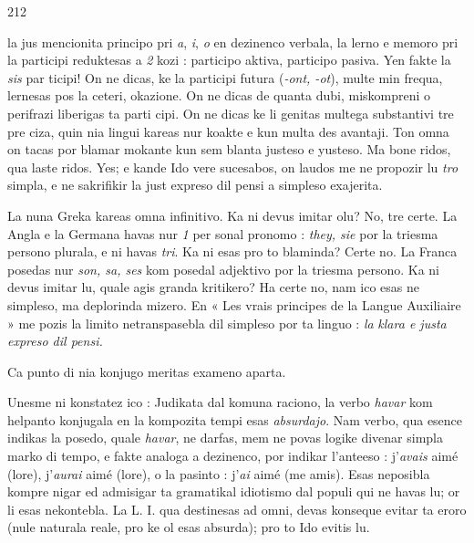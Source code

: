 \begin{VUpage}[216]{212}
\VUasterismo{107.61mm}

\VUcontinue
la jus mencionita principo pri \textit{a}, \textit{i}, \textit{o} en dezinenco verbala,\nl
la lerno e memoro pri la participi reduktesas a \textit{2} kozi :\nl
{} participo aktiva,  participo pasiva. Yen fakte la \textit{sis} par\cc
ticipi! On ne dicas, ke la participi futura (\textit{-ont, -ot}), multe\nl
min frequa, lernesas pos la ceteri, okazione. On ne dicas\nl
de quanta dubi, miskompreni o perifrazi liberigas ta parti\cc
cipi. On ne dicas ke li genitas multega substantivi tre pre\cc
ciza, quin nia lingui kareas nur koakte e kun multa des\cc
avantaji. Ton omna on tacas por blamar mokante kun sem\cc
blanta justeso e yusteso. Ma bone ridos, qua laste ridos.\nl
Yes; e kande Ido vere sucesabos, on laudos me ne propozir\nl
lu \textit{tro} simpla, e ne sakrifikir la just expreso dil pensi a\nl
simpleso exajerita.

La nuna Greka kareas omna infinitivo. Ka ni devus imitar\nl
olu? No, tre certe. La Angla e la Germana havas nur \textit{1} per\cc
sonal pronomo : \textit{they, sie} por la triesma persono plurala, e\nl
ni havas \textit{tri}. Ka ni esas pro to blaminda? Certe no. La Franca\nl
posedas nur \textit{son, sa, ses} kom posedal adjektivo por la triesma\nl
persono. Ka ni devus imitar lu, quale agis granda kritikero?\nl
Ha certe no, nam ico esas ne simpleso, ma deplorinda mizero.\nl
En « Les vrais principes de la Langue Auxiliaire » me pozis\nl
la limito netranspasebla dil simpleso por ta linguo : \textit{la}\nl
\textit{klara e justa expreso dil pensi.}

\VUsaut{10.63mm}
\VUsaut{3.02mm}

Ca punto di nia konjugo meritas exameno aparta.

Unesme ni konstatez ico : Judikata dal komuna raciono,\nl
la verbo \textit{havar} kom helpanto konjugala en la kompozita tempi\nl
esas \textit{absurdajo}. Nam verbo, qua esence indikas la posedo,\nl
quale \textit{havar}, ne darfas, mem ne povas logike divenar simpla\nl
marko di tempo, e fakte analoga a dezinenco, por indikar\nl
l'anteeso : j'\textit{avais} aimé (lore), j'\textit{aurai} aimé (lore), o \nl
la pasinto : j'\textit{ai} aimé (me amis). Esas neposibla kompre\cc
nigar ed admisigar ta gramatikal idiotismo dal populi qui\nl
ne havas lu; or li esas nekontebla. La L. I. qua destinesas\nl
ad omni, devas konseque evitar ta eroro (nule naturala reale,\nl
pro ke ol esas absurda); pro to Ido evitis lu.
\end{VUpage}

